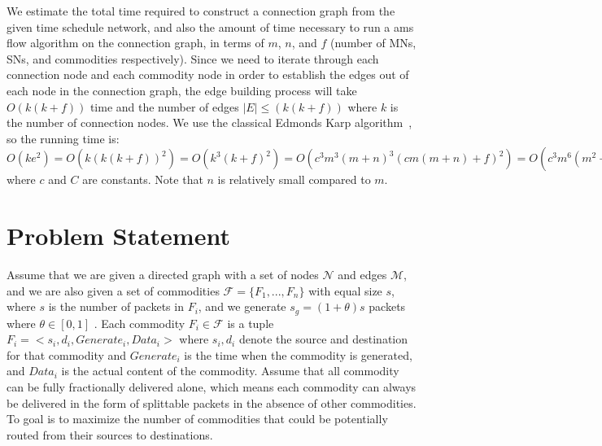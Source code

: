 \documentclass[conference]{IEEEtran}
\begin{document}
{We estimate the total time required to construct a connection graph from the given time schedule network, and also the amount of time necessary to run a ams flow algorithm on the connection graph, in terms of $m$, $n$, and $f$ (number of MNs, SNs, and commodities respectively).  Since we need to iterate through each connection node and each commodity node in order to establish the edges out of each node in the connection graph, the edge building process will take $O(k(k+f))$ time and the number of edges $|E| \leq (k(k+f))$ where $k$ is the number of connection nodes.
We use the classical Edmonds Karp algorithm~\cite{edmonds}, so the running time is:
$O(ke^2)=O(k(k(k+f))^2)=O(k^3(k+f)^2) =O(c^3m^3(m+n)^3(cm(m+n)+f)^2)=O(c^3m^6(m^2+f)^2)=O(Cm^6(m^4+2m^2f+f^2))$ where $c$ and $C$ are constants. Note that $n$ is relatively small compared to $m$. 
}



\section{Problem Statement} \label{problem}

Assume that we are given a directed graph with a set of nodes $\mathcal N$ and edges $\mathcal M$, and we are also given a set of commodities $\mathcal F = \{F_1, ..., F_n\}$ with equal size $s$, where $s$ is the number of packets in $F_i$, and we generate $s_g = (1+\theta)s$ packets where $\theta \in [0, 1] $ . Each commodity $F_i \in \mathcal F$ is a tuple $F_i=<s_i, d_i, Generate_i, Data_i>$ where $s_i, d_i$ denote the source and destination for that commodity and $Generate_i$ is the time when the commodity is generated, and $Data_i$ is the actual content of the commodity.
Assume that all commodity can be fully fractionally delivered alone, which means each commodity can always be delivered in the form of splittable packets in the absence of other commodities. To goal is to maximize the number of commodities that could be potentially routed from their sources to destinations.
\end{document}
